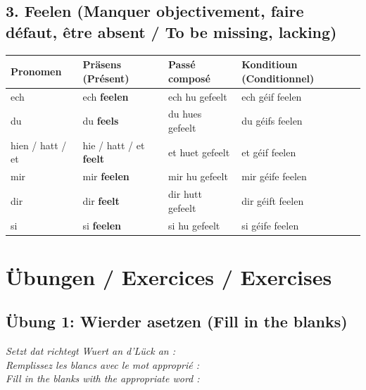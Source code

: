 \vspace{1em}

\subsection*{3. Feelen (Manquer objectivement, faire défaut, être absent / To be missing, lacking)}
\begin{center}
\begin{tabular}{llll}
\toprule
\textbf{Pronomen} & \textbf{Präsens (Présent)} & \textbf{Passé composé} & \textbf{Konditioun (Conditionnel)} \\
\midrule
ech & ech \textbf{feelen} & ech hu gefeelt & ech géif feelen \\
du & du \textbf{feels} & du hues gefeelt & du géifs feelen \\
hien / hatt / et & hie / hatt / et \textbf{feelt} & et huet gefeelt & et géif feelen \\
mir & mir \textbf{feelen} & mir hu gefeelt & mir géife feelen \\
dir & dir \textbf{feelt} & dir hutt gefeelt & dir géift feelen \\
si & si \textbf{feelen} & si hu gefeelt & si géife feelen \\
\bottomrule
\end{tabular}
\end{center}

\vspace{1.5em}

\section[Übungen / Exercises]{Übungen / Exercices / Exercises}

\subsection*{Übung 1: Wierder asetzen (Fill in the blanks)}
\textit{Setzt dat richtegt Wuert an d'Lück an :}\\
\textit{Remplissez les blancs avec le mot approprié :}\\
\textit{Fill in the blanks with the appropriate word :}

